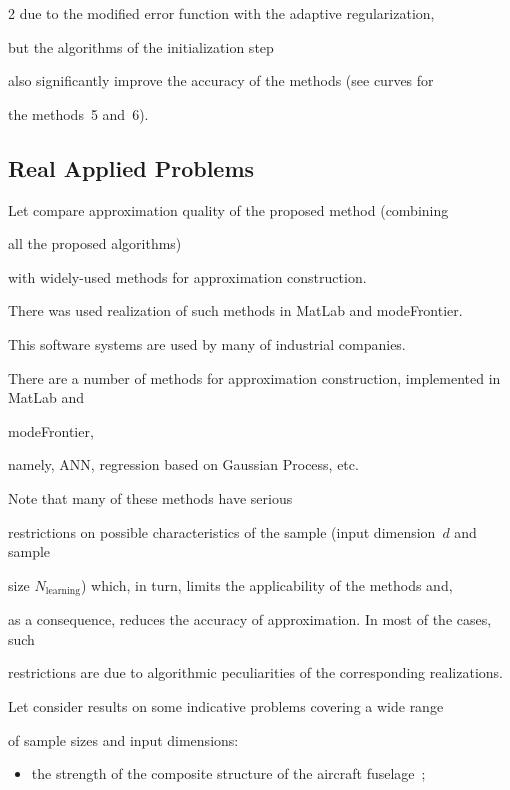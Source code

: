 \begin{multicols}{2}
due to the modified error function with the adaptive regularization, 

but the algorithms of the initialization step 

also significantly improve the accuracy of the methods (see curves for 

the methods~5 and~6).



\subsection{Real Applied Problems}



\noindent

Let compare approximation quality of the proposed method (combining 

all the proposed algorithms)

with widely-used methods for approximation construction.

There was used realization of such methods in MatLab and modeFrontier.

This software systems are used by many of industrial companies.

There are a number of methods for approximation construction, implemented in MatLab and 

modeFrontier,

namely, ANN, regression based on Gaussian Process, etc.

Note that many of these methods have serious 

restrictions on possible characteristics of the sample (input dimension~$d$ and sample 

size $N_{\mathrm{learning}}$) which, in turn, limits the applicability of the methods and,

as a consequence, reduces the accuracy of approximation. In most of the cases, such 

restrictions are due to algorithmic peculiarities of the corresponding realizations.

{



}



Let consider results on some indicative problems covering a wide range 

of sample sizes and input dimensions:

\begin{itemize}

  \item the strength of the composite structure of the aircraft fuselage~\cite{copti};


\end{itemize}
\end{multicols}
